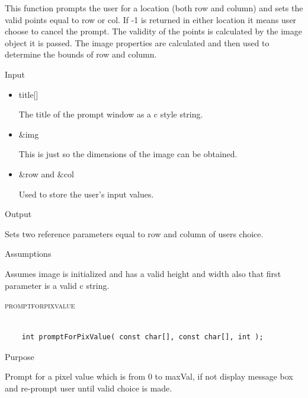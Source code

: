 \documentclass[pdftex, 11pt]{article}
\begin{document}
\begin{description}
\begin{description}
				This function prompts the user for a location (both row and column) and sets
				the valid points equal to row or col.  If -1 is returned in either location
				it means user choose to cancel the prompt.  The validity of the points is
				calculated by the image object it is passed.  The image properties are
				calculated and then used to determine the bounds of row and column.

			\item{Input}

				\begin{itemize}

					\item{title[]}

						The title of the prompt window as a c style string.

					\item{\&img}

						This is just so the dimensions of the image can be obtained.

					\item{\&row and \&col}

						Used to store the user's input values.

				\end{itemize}

			\item{Output}

				Sets two reference parameters equal to row and column of
				users choice.

			\item{Assumptions}

				Assumes image is initialized and has a valid height and width
				also that first parameter is a valid c string.

		\end{description}



	\item{\textsc{promptforpixvalue}}

		\begin{lstlisting}

	int promptForPixValue( const char[], const char[], int );
		\end{lstlisting}

		\begin{description}
			\item{Purpose}

				Prompt for a pixel value which is from 0 to maxVal, if not display message
				box and re-prompt user until valid choice is made.


\end{description}
\end{description}
\end{document}
